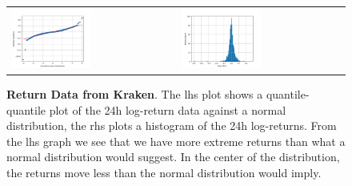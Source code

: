 \documentclass[english,11pt]{article}
\begin{document}
\begin{figure}[h]
    \center
    \begin{tabular}{ll}
    \includegraphics[width=0.5\textwidth]{qq_normal_kraken24h.png} &
    \includegraphics[width=0.5\textwidth]{hist24hreturns_kraken.png} \\
    \end{tabular}
    \caption{\textbf{Return Data from Kraken}. The lhs plot shows a quantile-quantile plot
    of the 24h log-return data against a normal distribution, the rhs
    plots a histogram of the 24h log-returns.
    From the lhs graph we see that we have more extreme returns than what a normal
    distribution would suggest. In the center of the distribution, the 
    returns move less than the normal distribution would imply.}\label{fig:qqplots}
\end{figure}
\end{document}
